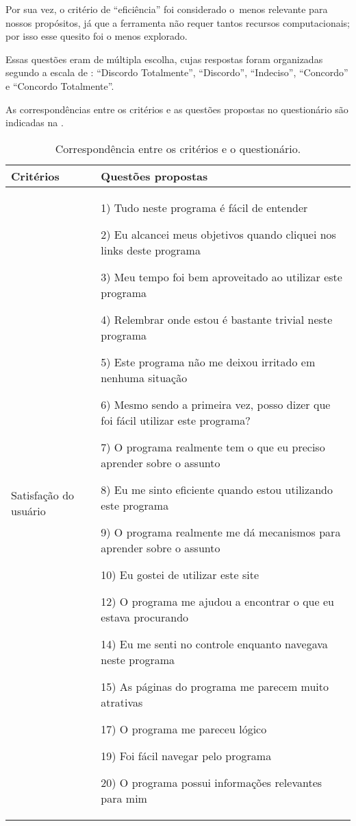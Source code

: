 \documentclass[portuguese]{textolivre}
\begin{document}
Por sua vez, o critério de “eficiência” foi considerado o menos relevante para nossos propósitos, já que a ferramenta não requer tantos recursos computacionais; por isso esse quesito foi o menos explorado.

Essas questões eram de múltipla escolha, cujas respostas foram organizadas segundo a escala de \textcite{likert1932}: “Discordo Totalmente”, “Discordo”, “Indeciso”, “Concordo” e “Concordo Totalmente”.

As correspondências entre os critérios e as questões propostas no questionário são indicadas na .

\begin{table}[htbp]
\begin{threeparttable}
\caption{Correspondência entre os critérios e o questionário.}
\label{tbl1}
\centering
\begin{small}
\begin{tabular}{p{2cm} p{8cm}}
\toprule
Critérios & Questões propostas \\ 
\midrule
Satisfação do usuário & 
1) Tudo neste programa é fácil de entender

2) Eu alcancei meus objetivos quando cliquei nos links deste programa

3) Meu tempo foi bem aproveitado ao utilizar este programa

4) Relembrar onde estou é bastante trivial neste programa

5) Este programa não me deixou irritado em nenhuma situação

6) Mesmo sendo a primeira vez, posso dizer que foi fácil utilizar este programa?

7) O programa realmente tem o que eu preciso aprender sobre o assunto

8) Eu me sinto eficiente quando estou utilizando este programa

9) O programa realmente me dá mecanismos para aprender sobre o assunto

10) Eu gostei de utilizar este site

12) O programa me ajudou a encontrar o que eu estava procurando

14) Eu me senti no controle enquanto navegava neste programa

15) As páginas do programa me parecem muito atrativas

17) O programa me pareceu lógico

19) Foi fácil navegar pelo programa

20) O programa possui informações relevantes para mim


\end{tabular}
\end{small}
\end{threeparttable}
\end{table}
\end{document}
